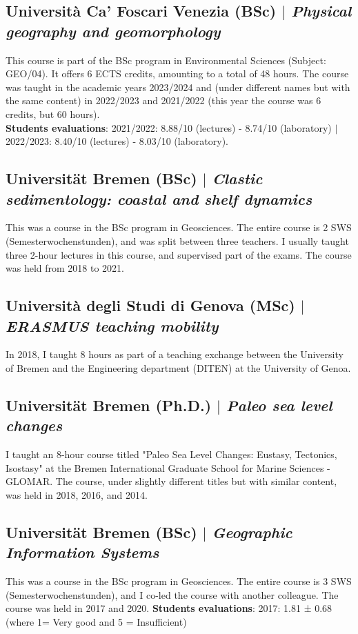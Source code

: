 \documentclass[11pt]{article}
\begin{document}
\subsection{Università Ca' Foscari Venezia (BSc) $|$ {\normalfont\textit{Physical geography and geomorphology}}}
{\footnotesize This course is part of the BSc program in Environmental Sciences (Subject: GEO/04). It offers 6 ECTS credits, amounting to a total of 48 hours. The course was taught in the academic years 2023/2024 and (under different names but with the same content) in 2022/2023 and 2021/2022 (this year the course was 6 credits, but 60 hours).\\
\textbf{Students evaluations}:
2021/2022: 8.88/10 (lectures) - 8.74/10 (laboratory) $|$ 2022/2023: 8.40/10 (lectures) - 8.03/10 (laboratory).}
\bigskip

\subsection{Universität Bremen (BSc) $|$ {\normalfont\textit{Clastic sedimentology: coastal and shelf dynamics}}}
{\footnotesize This was a course in the BSc program in Geosciences. The entire course is 2 SWS (Semesterwochenstunden), and was split between three teachers. I usually taught three 2-hour lectures in this course, and supervised part of the exams. The course was held from 2018 to 2021.}
\bigskip

\subsection{Università degli Studi di Genova (MSc) $|$ {\normalfont\textit{ERASMUS teaching mobility}}}
{\footnotesize In 2018, I taught 8 hours as part of a teaching exchange between the University of Bremen and the Engineering department (DITEN) at the University of Genoa.}
\bigskip

\subsection{Universität Bremen (Ph.D.) $|$ {\normalfont\textit{Paleo sea level changes}}}
{\footnotesize I taught an 8-hour course titled "Paleo Sea Level Changes: Eustasy, Tectonics, Isostasy" at the Bremen International Graduate School for Marine Sciences - GLOMAR. The course, under slightly different titles but with similar content, was held in 2018, 2016, and 2014.}
\bigskip

\subsection{Universität Bremen (BSc) $|$ {\normalfont\textit{Geographic Information Systems}}}
{\footnotesize This was a course in the BSc program in Geosciences. The entire course is 3 SWS (Semesterwochenstunden), and I co-led the course with another colleague. The course was held in 2017 and 2020. 
\textbf{Students evaluations}: 2017: 1.81 ± 0.68 (where 1= Very good and 5 = Insufficient)}
\bigskip
\end{document}
